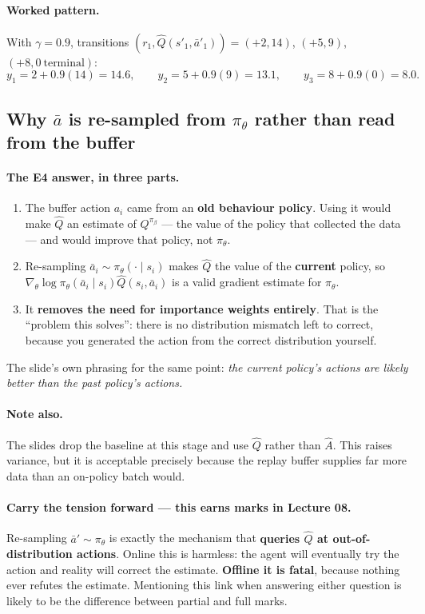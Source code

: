 \documentclass[11pt,a4paper]{article}
\begin{document}
\paragraph{Worked pattern.} With $\gamma=0.9$, transitions
$(r_1,\hat Q(s'_1,\bar a'_1))=(+2,14)$, $(+5,9)$, $(+8,0\ \text{terminal})$:
\[
y_1=2+0.9(14)=14.6,\qquad y_2=5+0.9(9)=13.1,\qquad y_3=8+0.9(0)=8.0 .
\]

\subsection{Why $\bar a$ is re-sampled from $\pi_\theta$ rather than read from the buffer}

\paragraph{The E4 answer, in three parts.}
\begin{enumerate}[label=(\roman*)]
\item The buffer action $a_i$ came from an \textbf{old behaviour policy}.
Using it would make $\hat Q$ an estimate of $Q^{\pi_\beta}$ --- the value of
the policy that collected the data --- and would improve that policy, not
$\pi_\theta$.
\item Re-sampling $\bar a_i\sim\pi_\theta(\cdot\mid s_i)$ makes $\hat Q$ the
value of the \textbf{current} policy, so
$\nabla_\theta\log\pi_\theta(\bar a_i\mid s_i)\hat Q(s_i,\bar a_i)$ is a valid
gradient estimate for $\pi_\theta$.
\item It \textbf{removes the need for importance weights entirely}. That is
the ``problem this solves'': there is no distribution mismatch left to correct,
because you generated the action from the correct distribution yourself.
\end{enumerate}
The slide's own phrasing for the same point: \emph{the current policy's
actions are likely better than the past policy's actions.}

\paragraph{Note also.} The slides drop the baseline at this stage and use
$\hat Q$ rather than $\hat A$. This raises variance, but it is acceptable
precisely because the replay buffer supplies far more data than an on-policy
batch would.

\paragraph{Carry the tension forward --- this earns marks in Lecture 08.}
Re-sampling $\bar a'\sim\pi_\theta$ is exactly the mechanism that
\textbf{queries $\hat Q$ at out-of-distribution actions}. Online this is
harmless: the agent will eventually try the action and reality will correct the
estimate. \textbf{Offline it is fatal}, because nothing ever refutes the
estimate. Mentioning this link when answering either question is likely to be
the difference between partial and full marks.
\end{document}
